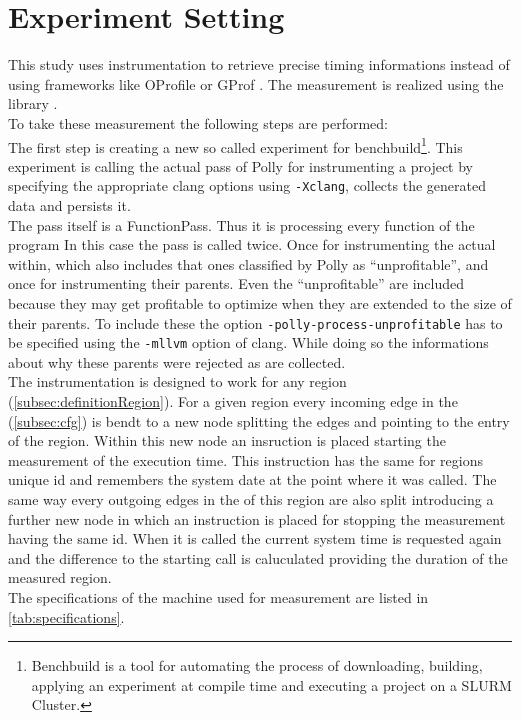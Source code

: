\section{Experiment Setting}
This study uses instrumentation to retrieve precise timing informations instead of using frameworks like OProfile \cite{oprofile} or GProf \cite{gprof}.
The measurement is realized using the \papi library \cite{papi}.\\
To take these measurement the following steps are performed:\\
The first step is creating a new so called experiment for benchbuild\footnote{Benchbuild is a tool for automating the process of downloading, building, applying an experiment at compile time and executing a project on a SLURM Cluster.}.
This experiment is calling the actual pass of Polly for instrumenting a project by specifying the appropriate clang options using \texttt{-Xclang}, collects the generated data and persists it.\\
The pass itself is a FunctionPass.
Thus it is processing every function of the program
In this case the pass is called twice.
Once for instrumenting the actual \scops within, which also includes that ones classified by Polly as \enquote{unprofitable}, and once for instrumenting their parents.
Even the \enquote{unprofitable} \scops are included because they may get profitable to optimize when they are extended to the size of their parents.
To include these \scops the option \texttt{-polly-process-unprofitable} has to be specified using the \texttt{-mllvm} option of clang.
While doing so the informations about why these parents were rejected as \scops are collected.\\
The instrumentation is designed to work for any region (\autoref{subsec:definitionRegion}).
For a given region every incoming edge in the \cfg (\autoref{subsec:cfg}) is bendt to a new node splitting the edges and pointing to the entry of the region.
Within this new node an insruction is placed starting the measurement of the execution time.
This instruction has the same for regions unique id and remembers the system date at the point where it was called.
The same way every outgoing edges in the \cfg of this region are also split introducing a further new node in which an instruction is placed for stopping the measurement having the same id.
When it is called the current system time is requested again and the difference to the starting call is caluculated providing the duration of the measured region.\\
The specifications of the machine used for measurement are listed in \autoref{tab:specifications}.
